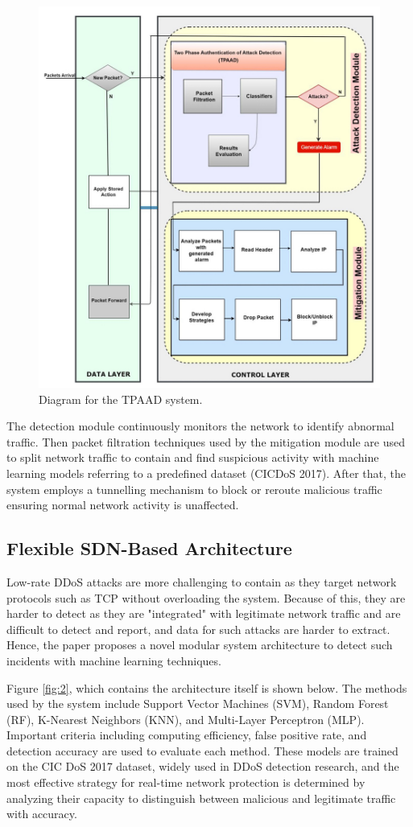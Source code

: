 \documentclass[a4paper, 12pt]{article}
\begin{document}
\begin{figure}[H]
    \centering
    \includegraphics[width=0.7\linewidth]{IMG_0249.jpeg}
    \caption{Diagram for the TPAAD system. \protect{}}
    \label{fig:1}
\end{figure}

The detection module continuously monitors the network to identify abnormal traffic. Then packet filtration techniques used by the mitigation module are used to split network traffic to contain and find suspicious activity with machine learning models referring to a predefined dataset (CICDoS 2017). After that, the system employs a tunnelling mechanism to block or reroute malicious traffic ensuring normal network activity is unaffected. 

\clearpage

\subsection{Flexible SDN-Based Architecture}
Low-rate DDoS attacks are more challenging to contain as they target network protocols such as TCP without overloading the system. Because of this, they are harder to detect as they are "integrated" with legitimate network traffic and are difficult to detect and report, and data for such attacks are harder to extract. Hence, the paper proposes a novel modular system architecture to detect such incidents with machine learning techniques. 

Figure \ref{fig:2}, which contains the architecture itself is shown below. The methods used by the system include Support Vector Machines (SVM), Random Forest (RF), K-Nearest Neighbors (KNN), and Multi-Layer Perceptron (MLP).  Important criteria including computing efficiency, false positive rate, and detection accuracy are used to evaluate each method. These models are trained on the CIC DoS 2017 dataset, widely used in DDoS detection research, and the most effective strategy for real-time network protection is determined by analyzing their capacity to distinguish between malicious and legitimate traffic with accuracy. 
\end{document}
